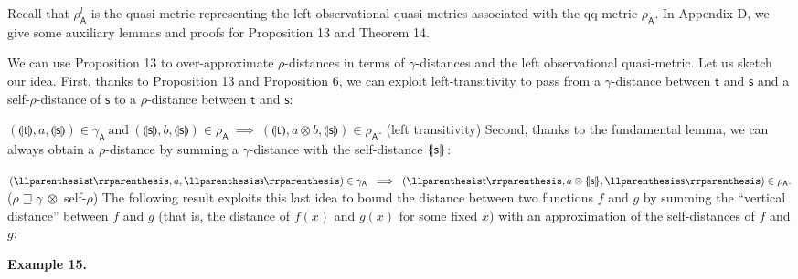 \documentclass[10pt,a4paper]{amsart}
\begin{document}
 
 
Recall that $\rho_{\mathsf{A}}^{l}$ is the quasi-metric representing the left observational quasi-metrics associated with the qq-metric $\rho_{\mathsf{A}}$. In Appendix D, we give some auxiliary lemmas and proofs for Proposition 13 and Theorem 14.\par
 

 
We can use Proposition 13 to over-approximate $\rho$-distances in terms of $\gamma$-distances and the left observational quasi-metric. Let us sketch our idea. First, thanks to Proposition 13 and Proposition 6, we can exploit left-transitivity to pass from a $\gamma$-distance between $\mathsf{t}$ and $\mathsf{s}$ and a self-$\rho$-distance of $\mathsf{s}$ to a $\rho$-distance between $\mathsf{t}$ and $\mathsf{s}$:\par
    $\displaystyle(\llparenthesis\mathsf{t}\rrparenthesis,a,\llparenthesis\mathsf{s%
}\rrparenthesis)\in\gamma_{\mathsf{A}}\ \text{and}\ (\llparenthesis\mathsf{s}%
\rrparenthesis,b,\llparenthesis\mathsf{s}\rrparenthesis)\in\rho_{{\mathsf{A}}}%
\ \implies\ (\llparenthesis\mathsf{t}\rrparenthesis,a\otimes b,\llparenthesis%
\mathsf{s}\rrparenthesis)\in\rho_{{\mathsf{A}}}.$  (left transitivity)   
Second, thanks to the fundamental lemma, we can always obtain a $\rho$-distance by summing a $\gamma$-distance with the self-distance $\{\hskip-2.25pt|\mathsf{s}|\hskip-2.25pt\}$:\par
    $\displaystyle(\llparenthesis\mathsf{t}\rrparenthesis,a,\llparenthesis\mathsf{s%
}\rrparenthesis)\in\gamma_{\mathsf{A}}\ \implies\ (\llparenthesis\mathsf{t}%
\rrparenthesis,a\otimes\{\hskip-2.25pt|\mathsf{s}|\hskip-2.25pt\},%
\llparenthesis\mathsf{s}\rrparenthesis)\in\rho_{{\mathsf{A}}}.$  ($\rho\sqsupseteq\gamma\ \otimes$ self-$\rho$)   
The following result exploits this last idea to bound the distance between two functions $f$ and $g$ by summing the “vertical distance” between $f$ and $g$ (that is, the distance of $f(x)$ and $g(x)$ for some fixed $x$) with an approximation of the self-distances of $f$ and $g$:\par
 

 
\par\medskip\noindent\textbf{Example 15.}\par
 
\end{document}
